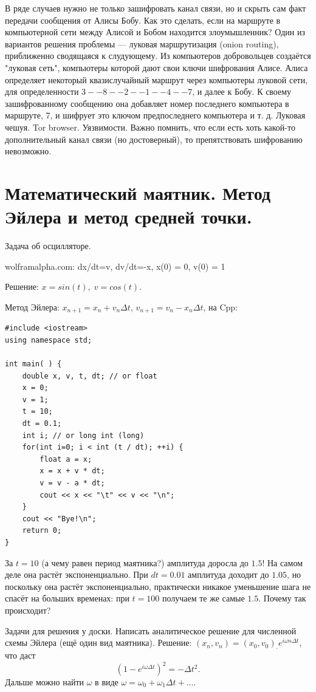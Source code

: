 \documentclass{book}
\begin{document}
В ряде случаев нужно не только зашифровать канал связи, но и скрыть сам факт передачи сообщения от
Алисы Бобу. Как это сделать, если на маршруте в компьютерной сети между Алисой и Бобом находится
злоумышленник? Один из вариантов решения проблемы --- луковая маршрутизация (onion routing),
приближенно сводящаяся к слудующему. Из компьютеров добровольцев создаётся "луковая сеть",
компьютеры которой дают свои ключи шифрования Алисе. Алиса определяет некоторый квазислучайный
маршрут через компьютеры луковой сети, для определенности $3--8--2--1--4--7$, и далее к Бобу. К
своему зашифрованному сообщению она добавляет номер последнего компьютера в маршруте, 7, и шифрует
это ключом предпоследнего компьютера и т. д. Луковая чешуя. Tor browser. Уязвимости. Важно помнить,
что если есть хоть какой-то дополнительный канал связи (но достоверный), то препятствовать
шифрованию невозможно.

\section{Математический маятник. Метод Эйлера и метод средней точки.}

Задача об осцилляторе.

wolframalpha.com: dx/dt=v, dv/dt=-x, x(0) = 0, v(0) = 1

Решение: $x = sin(t), \; v = cos(t)$.

Метод Эйлера: $x_{n+1} = x_n + v_n \Delta t$, $v_{n+1} = v_n - x_n \Delta t$, на Cpp:

\begin{verbatim}
#include <iostream> 
using namespace std;

int main( ) { 
    double x, v, t, dt; // or float
    x = 0; 
    v = 1; 
    t = 10; 
    dt = 0.1; 
    int i; // or long int (long)
    for(int i=0; i < int (t / dt); ++i) { 
        float a = x; 
        x = x + v * dt; 
        v = v - a * dt; 
        cout << x << "\t" << v << "\n";
    } 
    cout << "Bye!\n";
    return 0; 
}
\end{verbatim}
За $t = 10$ (а чему равен период маятника?) амплитуда доросла до $1.5$! На самом деле она растёт
экспоненциально. При $dt = 0.01$ амплитуда доходит до $1.05$, но поскольку она растёт
экспоненциально, практически никакое уменьшение шага не спасёт на больших временах: при $t = 100$
получаем те же самые $1.5$. Почему так происходит?

Задачи для решения у доски. Написать аналитическое решение для численной схемы Эйлера (ещё один вид
маятника). Решение: $(x_n, v_n) = (x_0, v_0)_\cdot e^{i \omega n \Delta t}$, что даст
\begin{equation}
    (1 - e^{i \omega \Delta t})^2 = -\Delta t^2.
\end{equation}
Дальше можно найти $\omega$ в виде $\omega = \omega_0 + \omega_1 \Delta t + ...$.
\end{document}
